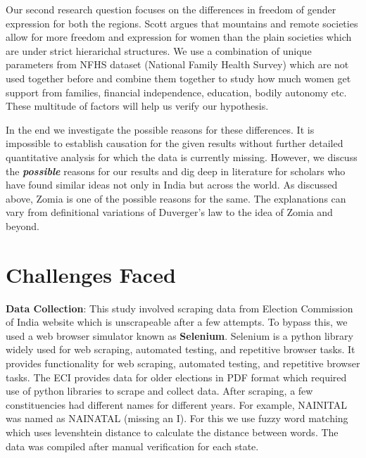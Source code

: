\vspace{0.2cm}

Our second research question focuses on the differences in freedom of gender expression for both the regions. Scott argues that mountains and remote societies allow for more freedom and expression for women than the plain societies which are under strict hierarichal structures. We use a combination of unique parameters from NFHS dataset (National Family Health Survey) which are not used together before and combine them together to study how much women get support from families, financial independence, education, bodily autonomy etc. These multitude of factors will help us verify our hypothesis.

\vspace{0.2cm}

In the end we investigate the possible reasons for these differences. It is impossible to establish causation for the given results without further detailed quantitative analysis for which the data is currently missing. However, we discuss the \textit{\textbf{possible}} reasons for our results and dig deep in literature for scholars who have found similar ideas not only in India but across the world. As discussed above, Zomia is one of the possible reasons for the same. The explanations can vary from definitional variations of Duverger's law to the idea of Zomia and beyond. 

\section{Challenges Faced}

\textbf{Data Collection}: This study involved scraping data from Election Commission of India \citep{ECI_WEBSITE} website which is unscrapeable after a few attempts. To bypass this, we used a web browser simulator known as \textbf{Selenium}. Selenium is a python library widely used for web scraping, automated testing, and repetitive browser tasks. It provides functionality for web scraping, automated testing, and repetitive browser tasks. The ECI provides data for older elections in PDF format which required use of python libraries to scrape and collect data. After scraping, a few constituencies had different names for different years. For example, NAINITAL was named as NAINATAL (missing an I). For this we use fuzzy word matching which uses levenshtein distance to calculate the distance between words. The data was compiled after manual verification for each state.

